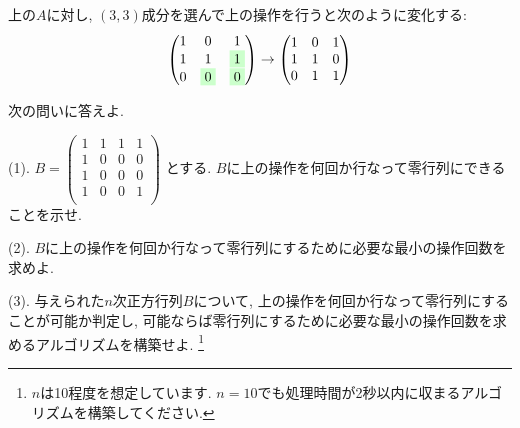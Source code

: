 \documentclass[dvipdfmx,a4paper,11pt]{article}
\theoremstyle{definition}
\begin{document}
上の$A$に対し, $(3,3)$成分を選んで上の操作を行うと次のように変化する:
 $$
  \begin{pmatrix}
1 & 0 & 1\\
1 & 1 & \colorbox[rgb]{0.8, 1.0, 0.8}{1}\\
0 & \colorbox[rgb]{0.8, 1.0, 0.8}{0} & \colorbox[rgb]{0.8, 1.0, 0.8}{0} \\
 \end{pmatrix}
 \rightarrow 
  \begin{pmatrix}
1 & 0 & 1\\
1 & 1 & 0\\
0 & 1 & 1 \\
 \end{pmatrix}
 $$

次の問いに答えよ.
\vspace{11pt}

(1). 
$
B = 
  \begin{pmatrix}
1 & 1 & 1 & 1\\
1 & 0 & 0 & 0 \\
1 & 0 & 0 & 0 \\
1 & 0 & 0 & 1 \\
 \end{pmatrix}
 $
とする. $B$に上の操作を何回か行なって零行列にできることを示せ.

(2). $B$に上の操作を何回か行なって零行列にするために必要な最小の操作回数を求めよ.

(3). 与えられた$n$次正方行列$B$について, 上の操作を何回か行なって零行列にすることが可能か判定し, 可能ならば零行列にするために必要な最小の操作回数を求めるアルゴリズムを構築せよ.  \footnote{$n$は10程度を想定しています. $n=10$でも処理時間が2秒以内に収まるアルゴリズムを構築してください.}
\end{document}

